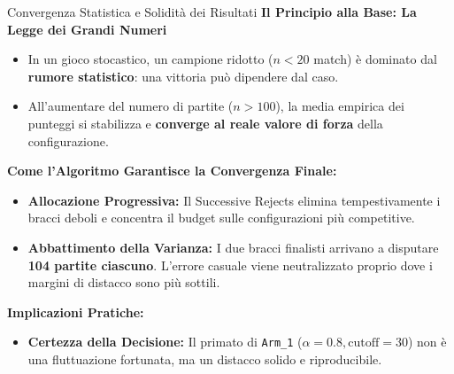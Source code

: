\documentclass[10pt]{beamer}
\begin{document}
\begin{frame}{Convergenza Statistica e Solidità dei Risultati}
    \textbf{Il Principio alla Base: La Legge dei Grandi Numeri}
    \begin{itemize}
        \item In un gioco stocastico, un campione ridotto ($n < 20$ match) è dominato dal \textbf{rumore statistico}: una vittoria può dipendere dal caso.
        \item All'aumentare del numero di partite ($n > 100$), la media empirica dei punteggi si stabilizza e \textbf{converge al reale valore di forza} della configurazione.
    \end{itemize}

    \vspace{0.25cm}
    \textbf{Come l'Algoritmo Garantisce la Convergenza Finale:}
    \begin{itemize}
        \item \textbf{Allocazione Progressiva:} Il Successive Rejects elimina tempestivamente i bracci deboli e concentra il budget sulle configurazioni più competitive.
        \item \textbf{Abbattimento della Varianza:} I due bracci finalisti arrivano a disputare \textbf{104 partite ciascuno}. L'errore casuale viene neutralizzato proprio dove i margini di distacco sono più sottili.
    \end{itemize}

    \vspace{0.25cm}
    \textbf{Implicazioni Pratiche:}
    \begin{itemize}
        \item \textbf{Certezza della Decisione:} Il primato di \texttt{Arm\_1} ($\alpha=0.8, \text{cutoff}=30$) non è una fluttuazione fortunata, ma un distacco solido e riproducibile.
    \end{itemize}
\end{frame}
\end{document}
